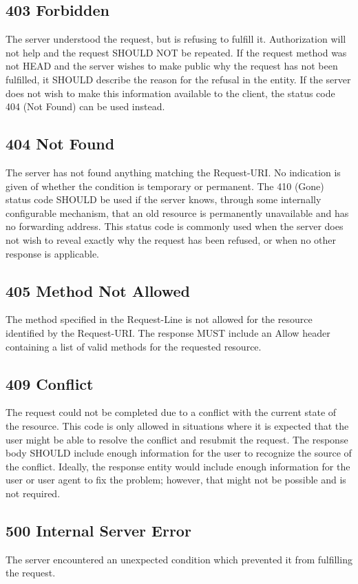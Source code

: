 \documentclass{report}
\begin{document}
	\subsection{403 Forbidden}
	The server understood the request, but is refusing to fulfill it. Authorization will not help and the request SHOULD NOT be repeated. If the request method was not HEAD and the server wishes to make public why the request has not been fulfilled, it SHOULD describe the reason for the refusal in the entity. If the server does not wish to make this information available to the client, the status code 404 (Not Found) can be used instead.
	\subsection{404 Not Found}
	The server has not found anything matching the Request-URI. No indication is given of whether the condition is temporary or permanent. The 410 (Gone) status code SHOULD be used if the server knows, through some internally configurable mechanism, that an old resource is permanently unavailable and has no forwarding address. This status code is commonly used when the server does not wish to reveal exactly why the request has been refused, or when no other response is applicable.
	\subsection{405 Method Not Allowed}
	The method specified in the Request-Line is not allowed for the resource identified by the Request-URI. The response MUST include an Allow header containing a list of valid methods for the requested resource.
	\subsection{409 Conflict}	
	The request could not be completed due to a conflict with the current state of the resource. This code is only allowed in situations where it is expected that the user might be able to resolve the conflict and resubmit the request. The response body SHOULD include enough information for the user to recognize the source of the conflict. Ideally, the response entity would include enough information for the user or user agent to fix the problem; however, that might not be possible and is not required.
	\subsection{ 500 Internal Server Error}
	The server encountered an unexpected condition which prevented it from fulfilling the request.
	\newpage
\end{document}
